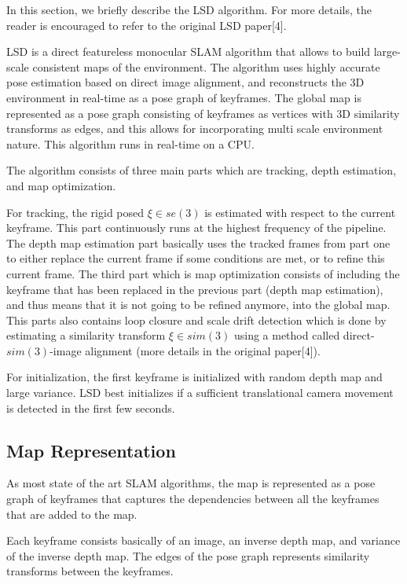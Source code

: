 In this section, we briefly describe the LSD algorithm. For more details, the reader is encouraged to refer to the original LSD paper[4].

LSD is a direct featureless monocular SLAM algorithm that allows to build large-scale consistent maps of the environment. The algorithm uses highly accurate pose estimation based on direct image alignment, and reconstructs the 3D environment in real-time as a pose graph of keyframes. The global map is represented as a pose graph consisting of keyframes as vertices with 3D similarity transforms as edges, and this allows for incorporating multi scale environment nature. This algorithm runs in real-time on a CPU.

The algorithm consists of three main parts which are tracking, depth estimation, and map optimization.

For tracking, the rigid posed $\xi \in se(3)$ is estimated with respect to the current keyframe. This part continuously runs at the highest frequency of the pipeline. The depth map estimation part basically uses the tracked frames from part one to either replace the current frame if some conditions are met, or to refine this current frame. The third part which is map optimization consists of including the keyframe that has been replaced in the previous part (depth map estimation), and thus means that it is not going to be refined anymore, into the global map. This parts also contains loop closure and scale drift detection which is done by estimating a similarity transform $\xi \in sim(3)$ using a method called direct-$sim(3)$-image alignment (more details in the original paper[4]).

For initialization, the first keyframe is initialized with random depth map and large variance. LSD best initializes if a sufficient translational camera movement is detected in the first few seconds.

\subsection{Map Representation}
As most state of the art SLAM algorithms, the map is represented as a pose graph of keyframes that captures the dependencies between all the keyframes that are added to the map.

Each keyframe consists basically of an image, an inverse depth map, and variance of the inverse depth map. The edges of the pose graph represents similarity transforms between the keyframes.


